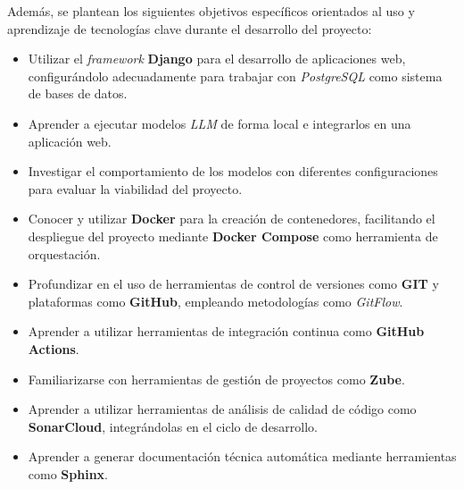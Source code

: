 Además, se plantean los siguientes objetivos específicos orientados al uso y aprendizaje de tecnologías clave durante el desarrollo del proyecto:

\begin{itemize}
    \item Utilizar el \textit{framework} \textbf{Django} para el desarrollo de aplicaciones web, configurándolo adecuadamente para trabajar con \textit{PostgreSQL} como sistema de bases de datos.
    \item Aprender a ejecutar modelos \textit{LLM} de forma local e integrarlos en una aplicación web.
    \item Investigar el comportamiento de los modelos con diferentes configuraciones para evaluar la viabilidad del proyecto.
    \item Conocer y utilizar \textbf{Docker} para la creación de contenedores, facilitando el despliegue del proyecto mediante \textbf{Docker Compose} como herramienta de orquestación.
    \item Profundizar en el uso de herramientas de control de versiones como \textbf{GIT} y plataformas como \textbf{GitHub}, empleando metodologías como \textit{GitFlow}.
    \item Aprender a utilizar herramientas de integración continua como \textbf{GitHub Actions}.
    \item Familiarizarse con herramientas de gestión de proyectos como \textbf{Zube}.
    \item Aprender a utilizar herramientas de análisis de calidad de código como \textbf{SonarCloud}, integrándolas en el ciclo de desarrollo.
    \item Aprender a generar documentación técnica automática mediante herramientas como \textbf{Sphinx}.
\end{itemize}

